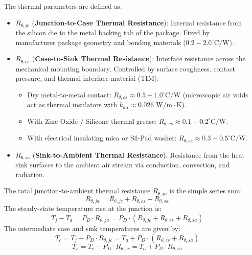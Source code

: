 \documentclass[11pt,a4paper]{article}
\begin{document}
The thermal parameters are defined as:
\begin{itemize}[leftmargin=*]
  \item $R_{\theta,jc}$ (\textbf{Junction-to-Case Thermal Resistance}): Internal resistance from the silicon die to the metal backing tab of the package. Fixed by manufacturer package geometry and bonding materials ($0.2 - 2.0^\circ\text{C/W}$).
  \item $R_{\theta,cs}$ (\textbf{Case-to-Sink Thermal Resistance}): Interface resistance across the mechanical mounting boundary. Controlled by surface roughness, contact pressure, and thermal interface material (TIM):
    \begin{itemize}
      \item Dry metal-to-metal contact: $R_{\theta,cs} \approx 0.5 - 1.0^\circ\text{C/W}$ (microscopic air voids act as thermal insulators with $k_{\text{air}} \approx 0.026\text{ W/m}\cdot\text{K}$).
      \item With Zinc Oxide / Silicone thermal grease: $R_{\theta,cs} \approx 0.1 - 0.2^\circ\text{C/W}$.
      \item With electrical insulating mica or Sil-Pad washer: $R_{\theta,cs} \approx 0.3 - 0.5^\circ\text{C/W}$.
    \end{itemize}
  \item $R_{\theta,sa}$ (\textbf{Sink-to-Ambient Thermal Resistance}): Resistance from the heat sink surfaces to the ambient air stream via conduction, convection, and radiation.
\end{itemize}

\begin{formulabox}
The total junction-to-ambient thermal resistance $R_{\theta,ja}$ is the simple series sum:
\begin{equation}
R_{\theta,ja} = R_{\theta,jc} + R_{\theta,cs} + R_{\theta,sa}
\end{equation}
The steady-state temperature rise at the junction is:
\begin{equation}
T_j - T_a = P_D \cdot R_{\theta,ja} = P_D \cdot (R_{\theta,jc} + R_{\theta,cs} + R_{\theta,sa})
\end{equation}
The intermediate case and sink temperatures are given by:
\begin{equation}
T_c = T_j - P_D \cdot R_{\theta,jc} = T_a + P_D \cdot (R_{\theta,cs} + R_{\theta,sa})
\end{equation}
\begin{equation}
T_s = T_c - P_D \cdot R_{\theta,cs} = T_a + P_D \cdot R_{\theta,sa}
\end{equation}
\end{formulabox}
\end{document}
